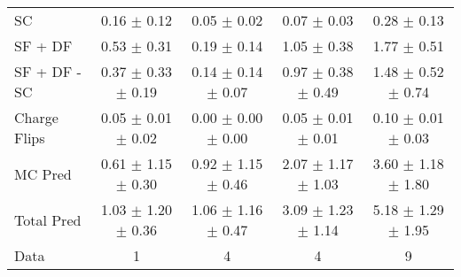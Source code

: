 \begin{tabular}{l|cccc}
                                 SC &  0.16 $\pm$  0.12 &  0.05 $\pm$  0.02 &  0.07 $\pm$  0.03 &  0.28 $\pm$  0.13 \\
                            SF + DF &  0.53 $\pm$  0.31 &  0.19 $\pm$  0.14 &  1.05 $\pm$  0.38 &  1.77 $\pm$  0.51 \\
\hline
                       SF + DF - SC &  0.37 $\pm$  0.33 $\pm$  0.19 &  0.14 $\pm$  0.14 $\pm$  0.07 &  0.97 $\pm$  0.38 $\pm$  0.49 &  1.48 $\pm$  0.52 $\pm$  0.74 \\
\hline\hline
                       Charge Flips &  0.05 $\pm$  0.01 $\pm$  0.02 &  0.00 $\pm$  0.00 $\pm$  0.00 &  0.05 $\pm$  0.01 $\pm$  0.01 &  0.10 $\pm$  0.01 $\pm$  0.03 \\
\hline
                            MC Pred &  0.61 $\pm$  1.15 $\pm$  0.30 &  0.92 $\pm$  1.15 $\pm$  0.46 &  2.07 $\pm$  1.17 $\pm$  1.03 &  3.60 $\pm$  1.18 $\pm$  1.80 \\
\hline
                         Total Pred &  1.03 $\pm$  1.20 $\pm$  0.36 &  1.06 $\pm$  1.16 $\pm$  0.47 &  3.09 $\pm$  1.23 $\pm$  1.14 &  5.18 $\pm$  1.29 $\pm$  1.95 \\
\hline\hline
                               Data &     1 &     4 &     4 &     9 \\
\hline\hline
\end{tabular}

